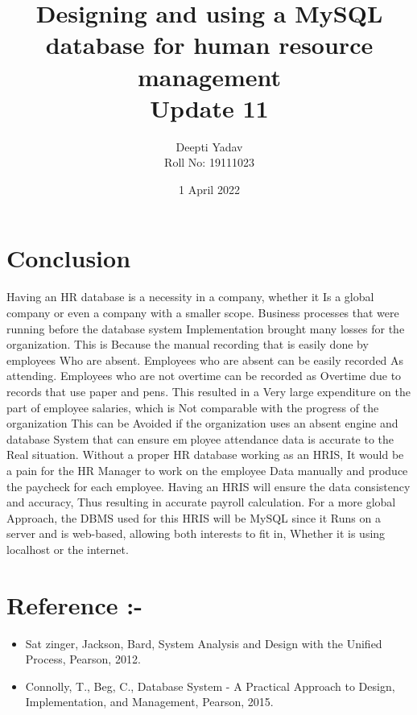 \documentclass{article}
\title{ Designing and using a MySQL database for human resource management\\ Update 11}
\date{1 April 2022}
\author{Deepti Yadav\\ Roll No: 19111023 }
\begin{document}
\maketitle
\section*{Conclusion}Having an HR database is a necessity in a company, whether it Is a global
company or even a company with a smaller scope. Business processes that
were running before the database system Implementation brought many
losses for the organization. This is Because the manual recording that is
easily done by employees Who are absent. Employees who are absent can
be easily recorded As attending. Employees who are not overtime can be
recorded as Overtime due to records that use paper and pens. This resulted
in a Very large expenditure on the part of employee salaries, which is Not
comparable with the progress of the organization This can be Avoided if the
organization uses an absent engine and database System that can ensure employee attendance data is accurate to the Real situation. Without a proper
HR database working as an HRIS, It would be a pain for the HR Manager
to work on the employee Data manually and produce the paycheck for each
employee. Having an HRIS will ensure the data consistency and accuracy,
Thus resulting in accurate payroll calculation. For a more global Approach,
the DBMS used for this HRIS will be MySQL since it Runs on a server and
is web-based, allowing both interests to fit in, Whether it is using localhost
or the internet.
\\
\section*{Reference :- }
\begin{itemize}
    \item Sat zinger, Jackson, Bard, System Analysis and Design with the Unified
Process, Pearson, 2012.
\item Connolly, T., Beg, C., Database System - A Practical Approach to
Design, Implementation, and Management, Pearson, 2015.
\end{itemize}
\end{document}
